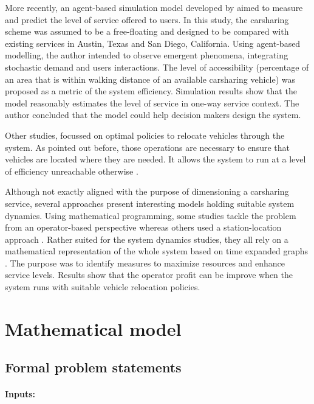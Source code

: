 \begin{bibunit}[ieeetr]
\medskip
More recently, an agent-based simulation model developed by \cite{barrios_performance_2012} aimed to measure and predict the level of service offered to users.
In this study, the carsharing scheme was assumed to be a free-floating and designed to be compared with existing services in Austin, Texas and San Diego, California.
Using agent-based modelling, the author intended to observe emergent phenomena, integrating stochastic demand and users interactions.
The level of accessibility (percentage of an area that is within walking distance of an available carsharing vehicle) was proposed as a metric of the system efficiency.
Simulation results show that the model reasonably estimates the level of service in one-way service context.
The author concluded that the model could help decision makers design the system.


\medskip
Other studies, focussed on optimal policies to relocate vehicles through the system.
As pointed out before, those operations are necessary to ensure that vehicles are located where they are needed.
It allows the system to run at a level of efficiency unreachable otherwise \cite{mitchell_reinventing_2010, nair_fleet_2011, febbraro_one_2012}.

Although not exactly aligned with the purpose of dimensioning a carsharing service, several approaches present interesting models holding suitable system dynamics.
Using mathematical programming, some studies tackle the problem from an operator-based perspective \cite{kek_relocation_2006, kek_decision_2009} whereas others used a station-location approach \cite{correia_optimization_2012, jorge_testing_2012}.
Rather suited for the system dynamics studies, they all rely on a mathematical representation of the whole system based on time expanded graphs \cite{ahuja_network_1993}.
The purpose was to identify measures to maximize resources and enhance service levels.
Results show that the operator profit can be improve when the system runs with suitable vehicle relocation policies.



\section{Mathematical model} \label{sec:mathModel}
\subsection{Formal problem statements}
\paragraph{Inputs:}


\end{bibunit}
